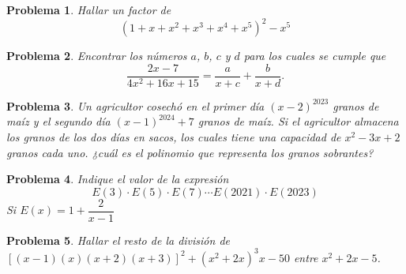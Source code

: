 \documentclass[12pt]{beamer}
\newtheorem{section-problem}{Problema}
\begin{document}
   \begin{frame}
      \begin{section-problem}
         Hallar un factor de
         \[ (1 + x + x^2 + x^3 + x^4 + x^5)^2 - x^5 \]
      \end{section-problem}
   \end{frame}

   \begin{frame}
      \begin{section-problem}
         Encontrar los números $a$, $b$, $c$ y $d$ para los cuales se cumple que
         \[\frac{2x - 7}{4x^2 + 16 x + 15} = \frac{a}{x + c} + \frac{b}{x + d}.\]
      \end{section-problem}
   \end{frame}

   \begin{frame}
      \begin{section-problem}
         Un agricultor cosechó en el primer día $(x - 2)^{2023}$ granos de maíz y el segundo día $(x - 1)^{2024} + 7$ granos de maíz.
         Si el agricultor almacena los granos de los dos días en sacos, los cuales tiene una capacidad de $x^2 - 3x + 2$ granos cada uno.
         ¿cuál es el polinomio que representa los granos sobrantes?
      \end{section-problem}
   \end{frame}

   \begin{frame}
      \begin{section-problem}
         Indique el valor de la expresión
         \[E(3)  \cdot E(5) \cdot E(7) \cdots E(2021) \cdot E(2023)\]
         Si $E(x) = 1 + \dfrac{2}{x - 1}$
      \end{section-problem}
   \end{frame}

   \begin{frame}
      \begin{section-problem}
         Hallar el resto de la división de $\left[(x - 1)(x)(x + 2)(x + 3)\right]^2 + (x^2 + 2x)^3 x - 50$ entre $x^2 + 2x - 5$.
      \end{section-problem}
   \end{frame}
\end{document}
